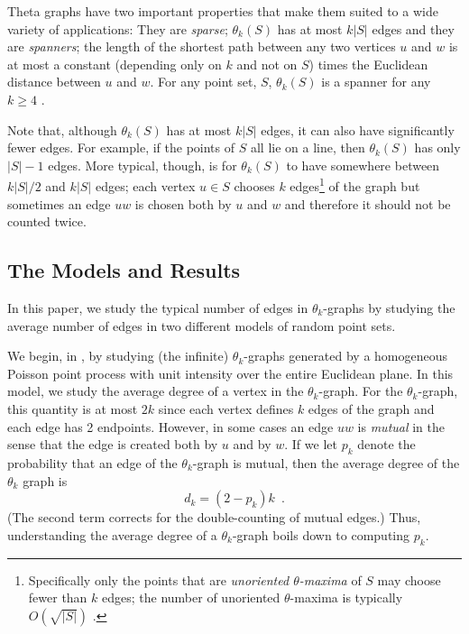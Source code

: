 \documentclass{patmorin}
\begin{document}
Theta graphs have two important properties that make them suited to a
wide variety of applications:  They are \emph{sparse}; $\theta_k(S)$
has at most $k|S|$ edges and they are \emph{spanners}; the length
of the shortest path between any two vertices $u$ and $w$ is at most
a constant (depending only on $k$ and not on $S$) times the Euclidean
distance between $u$ and $w$.  For any point set, $S$, $\theta_k(S)$ is
a spanner for any $k\ge 4$
\cite{barba.bose.ea:on,bonichon.gavoille.ea:connections,%
bose.morin.ea:theta-5,keil:approximating,ruppert.seidel:approximating}.

Note that, although $\theta_k(S)$ has at most $k|S|$ edges, it can also
have significantly fewer edges.  For example, if the points of $S$ all
lie on a line, then $\theta_k(S)$ has only $|S|-1$ edges.  More typical,
though, is for $\theta_k(S)$ to have somewhere between $k|S|/2$ and $k|S|$
edges;  each vertex $u\in S$ chooses $k$ edges\footnote{Specifically only
the points that are \emph{unoriented $\theta$-maxima} of $S$ may choose
fewer than $k$ edges; the number of unoriented $\theta$-maxima is typically
$O(\sqrt{|S|})$ \cite[Theorem~4]{avis.beresford-smith.ea:unoriented}.}
of the graph but sometimes an edge $uw$ is chosen both by $u$ and $w$
and therefore it should not be counted twice.

\subsection{The Models and Results}

In this paper, we study the typical number of edges in $\theta_k$-graphs
by studying the average number of edges in two different models of random
point sets.

We begin, in , by studying (the infinite)
$\theta_k$-graphs generated by a homogeneous Poisson point process
with unit intensity over the entire Euclidean plane.  In this model,
we study the average degree of a vertex in the $\theta_k$-graph.
For the $\theta_k$-graph, this quantity is at most $2k$ since each
vertex defines $k$ edges of the graph and each edge has 2 endpoints.
However, in some cases an edge $uw$ is \emph{mutual} in the sense that
the edge is created both by $u$ and by $w$.  If we let $p_k$ denote the
probability that an edge of the $\theta_k$-graph is mutual, then the
average degree of the $\theta_k$ graph is
\[
    d_k = (2-p_k)k \enspace .
\]
(The second term corrects for the double-counting of mutual edges.)  Thus,
understanding the average degree of a $\theta_k$-graph boils down to
computing $p_k$.
\end{document}
